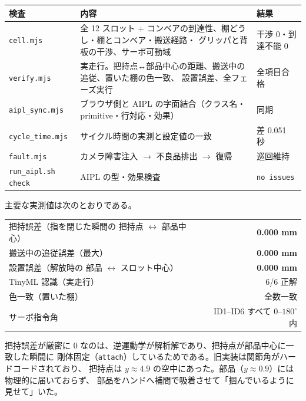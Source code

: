\documentclass[11pt,a4paper]{article}
\begin{document}
\begin{center}
\small
\begin{tabularx}{\textwidth}{@{}l >{\raggedright\arraybackslash}X l@{}}
\toprule
\textbf{検査} & \textbf{内容} & \textbf{結果} \\
\midrule
\texttt{cell.mjs} & 全 12 スロット + コンベアの到達性、棚どうし・棚とコンベア・搬送経路・
グリッパと背板の干渉、サーボ可動域 & 干渉 0・到達不能 0 \\
\texttt{verify.mjs} & 実走行。把持点↔部品中心の距離、搬送中の追従、置いた棚の色一致、
設置誤差、全フェーズ実行 & 全項目合格 \\
\texttt{aipl\_sync.mjs} & ブラウザ側と AIPL の字面結合（クラス名・primitive・行対応・効果） & 同期 \\
\texttt{cycle\_time.mjs} & サイクル時間の実測と設定値の一致 & 差 0.051 秒 \\
\texttt{fault.mjs} & カメラ障害注入 $\to$ 不良品排出 $\to$ 復帰 & 巡回維持 \\
\texttt{run\_aipl.sh check} & AIPL の型・効果検査 & \texttt{no issues} \\
\bottomrule
\end{tabularx}
\end{center}

\noindent
主要な実測値は次のとおりである。

\begin{center}
\small
\begin{tabular}{@{}lr@{}}
\toprule
把持誤差（指を閉じた瞬間の 把持点 $\leftrightarrow$ 部品中心） & \textbf{0.000 mm} \\
搬送中の追従誤差（最大） & \textbf{0.000 mm} \\
設置誤差（解放時の 部品 $\leftrightarrow$ スロット中心） & \textbf{0.000 mm} \\
TinyML 認識（実走行） & 6/6 正解 \\
色一致（置いた棚） & 全数一致 \\
サーボ指令角 & ID1--ID6 すべて $0\text{--}180^\circ$ 内 \\
\bottomrule
\end{tabular}
\end{center}

\noindent
把持誤差が厳密に 0 なのは、逆運動学が解析解であり、把持点が部品中心に一致した瞬間に
剛体固定（\texttt{attach}）しているためである。旧実装は関節角がハードコードされており、
把持点は $y \approx 4.9$ の空中にあった。部品（$y \approx 0.9$）には物理的に届いておらず、
部品をハンドへ補間で吸着させて「掴んでいるように見せて」いた。
\end{document}
